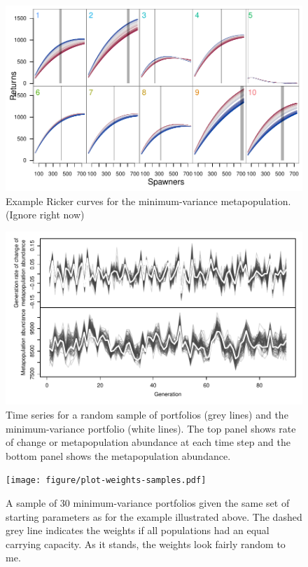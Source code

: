 \documentclass[12pt]{article}
\begin{document}
\begin{figure}[htbp]
\centering
\includegraphics{figure/unnamed-chunk-1.pdf}
\caption{Example Ricker curves for the minimum-variance metapopulation.
(Ignore right now)}
\end{figure}

\begin{figure}[htbp]
\centering
\includegraphics{figure/plot-portfolio-timeseries.pdf}
\caption{Time series for a random sample of portfolios (grey lines) and
the minimum-variance portfolio (white lines). The top panel shows rate
of change or metapopulation abundance at each time step and the bottom
panel shows the metapopulation abundance.}
\end{figure}

\begin{figure}[htbp]
\centering
\texttt{[image: figure/plot-weights-samples.pdf]}
\caption{A sample of 30 minimum-variance portfolios given the same set
of starting parameters as for the example illustrated above. The dashed
grey line indicates the weights if all populations had an equal carrying
capacity. As it stands, the weights look fairly random to me.}
\end{figure}
\end{document}
